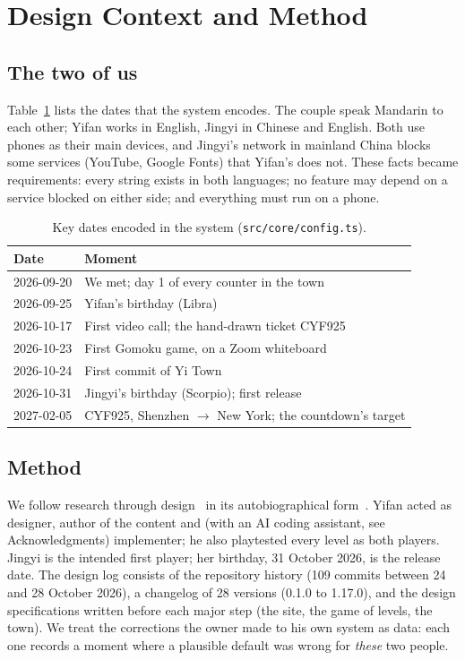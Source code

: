 \documentclass[sigconf,nonacm]{acmart}
\newcommand{\yt}{Yi Town}
\newcommand{\code}[1]{\texttt{\small #1}}
\begin{document}
\section{Design Context and Method}\label{sec:method}

\subsection{The two of us}
Table~\ref{tab:dates} lists the dates that the system encodes. The couple speak Mandarin to each
other; Yifan works in English, Jingyi in Chinese and English. Both use phones as their main
devices, and Jingyi's network in mainland China blocks some services (YouTube, Google Fonts) that
Yifan's does not. These facts became requirements: every string exists in both languages; no
feature may depend on a service blocked on either side; and everything must run on a phone.

\begin{table}[t]
  \caption{Key dates encoded in the system (\code{src/core/config.ts}).}
  \label{tab:dates}
  \small
  \begin{tabular}{@{}lp{}@{}}
    \toprule
    Date & Moment \\
    \midrule
    2026-09-20 & We met; day 1 of every counter in the town \\
    2026-09-25 & Yifan's birthday (Libra) \\
    2026-10-17 & First video call; the hand-drawn ticket CYF925 \\
    2026-10-23 & First Gomoku game, on a Zoom whiteboard \\
    2026-10-24 & First commit of \yt{} \\
    2026-10-31 & Jingyi's birthday (Scorpio); first release \\
    2027-02-05 & CYF925, Shenzhen $\rightarrow$ New York; the countdown's target \\
    \bottomrule
  \end{tabular}
\end{table}

\subsection{Method}
We follow research through design~\cite{zimmerman2007rtd,gaver2012expect} in its autobiographical
form~\cite{neustaedter2012autobiographical,desjardins2018tensions}. Yifan acted as designer, author
of the content and (with an AI coding assistant, see Acknowledgments) implementer; he also
playtested every level as both players. Jingyi is the intended first player; her birthday,
31 October 2026, is the release date. The design log consists of the repository history
(109 commits between 24 and 28 October 2026), a changelog of 28 versions (0.1.0 to 1.17.0), and the design
specifications written before each major step (the site, the game of levels, the town). We treat
the corrections the owner made to his own system as data: each one records a moment where a
plausible default was wrong for \emph{these} two people.
\end{document}
